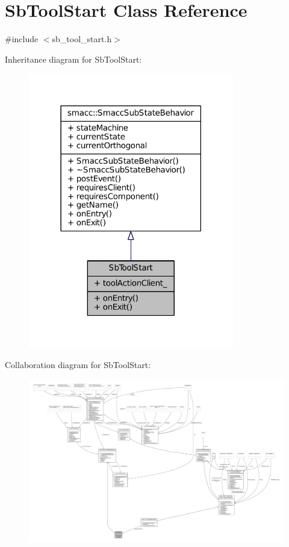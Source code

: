 \hypertarget{classSbToolStart}{}\section{Sb\+Tool\+Start Class Reference}
\label{classSbToolStart}


{\ttfamily \#include $<$sb\+\_\+tool\+\_\+start.\+h$>$}



Inheritance diagram for Sb\+Tool\+Start\+:
\nopagebreak
\begin{figure}[H]
\begin{center}
\leavevmode
\includegraphics[width=254pt]{classSbToolStart__inherit__graph}
\end{center}
\end{figure}


Collaboration diagram for Sb\+Tool\+Start\+:
\nopagebreak
\begin{figure}[H]
\begin{center}
\leavevmode
\includegraphics[width=350pt]{classSbToolStart__coll__graph}
\end{center}
\end{figure}
